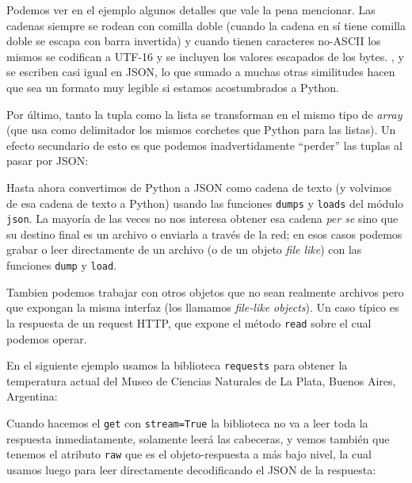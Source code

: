 Podemos ver en el ejemplo algunos detalles que vale la pena mencionar. Las cadenas siempre se rodean con comilla doble (cuando la cadena en sí tiene comilla doble se escapa con barra invertida) y cuando tienen caracteres no-ASCII los mismos se codifican a UTF-16 y se incluyen los valores escapados de los bytes. ,  y  se escriben casi igual en JSON, lo que sumado a muchas otras similitudes hacen que sea un formato muy legible si estamos acostumbrados a Python.

Por último, tanto la tupla como la lista se transforman en el mismo tipo de \textit{array} (que usa como delimitador los mismos corchetes que Python para las listas). Un efecto secundario de esto es que podemos inadvertidamente ``perder'' las tuplas al pasar por JSON:


Hasta ahora convertimos de Python a JSON como cadena de texto (y volvimos de esa cadena de texto a Python) usando las funciones \texttt{dumps} y \texttt{loads} del módulo \texttt{json}. La mayoría de las veces no nos interesa obtener esa cadena \textit{per se} sino que su destino final es un archivo o enviarla a través de la red; en esos casos podemos  grabar o leer directamente de un archivo (o de un objeto \textit{file like}) con las funciones \texttt{dump} y \texttt{load}.


Tambien podemos trabajar con otros objetos que no sean realmente archivos pero que expongan la misma interfaz (los llamamos \textit{file-like objects}). Un caso típico es la respuesta de un request HTTP, que expone el método \texttt{read} sobre el cual podemos operar.

En el siguiente ejemplo usamos la biblioteca \texttt{requests} para obtener la temperatura actual del Museo de Ciencias Naturales de La Plata, Buenos Aires, Argentina:


Cuando hacemos el \texttt{get} con \texttt{stream=True} la biblioteca no va a leer toda la respuesta inmediatamente, solamente leerá las cabeceras, y vemos también que tenemos el atributo \texttt{raw} que es  el objeto-respuesta a más bajo nivel, la cual usamos luego para leer directamente decodificando el JSON de la respuesta:



